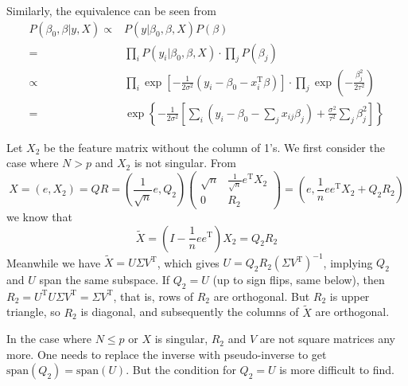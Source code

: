 \begin{sol}
Similarly, the equivalence can be seen from
\begin{align*}
P(\beta_0,\beta\vert y,X) \propto & P(y\vert\beta_0,\beta,X)P(\beta)\\
=& \prod_i P(y_i\vert\beta_0,\beta,X)\cdot\prod_j P(\beta_j)\\
\propto& \prod_i \exp\left[-\frac{1}{2\sigma^2}\left(y_i-\beta_0-x_i^\mathrm{T}\beta\right)\right] \cdot \prod_j \exp\left(-\frac{\beta_j^2}{2\tau^2}\right)\\
=& \exp\left\{-\frac{1}{2\sigma^2}\left[\sum_i \left(y_i-\beta_0-\sum_jx_{ij}\beta_j\right)+\frac{\sigma^2}{\tau^2}\sum_j \beta_j^2\right]\right\}
\end{align*}
\end{sol}

\begin{sol}
Let $X_2$ be the feature matrix without the column of 1's. We first consider the case where $N>p$ and $X_2$ is not singular. 
From
\[
X=(e,X_2)=QR=\left(\frac{1}{\sqrt{n}}e,Q_2\right)
\begin{pmatrix}
\sqrt{n} & \frac{1}{\sqrt{n}}e^\mathrm{T}X_2 \\
0 & R_2
\end{pmatrix}
=\left(e,\frac{1}{n}ee^\mathrm{T}X_2+Q_2R_2\right)
\]
we know that 
\[
\tilde{X}=\left(I-\frac{1}{n}ee^\mathrm{T}\right)X_2=Q_2R_2
\]
Meanwhile we have $\tilde{X}=U\Sigma V^\mathrm{T}$, which gives $U=Q_2R_2(\Sigma V^\mathrm{T})^{-1}$, implying $Q_2$ and $U$ span the same subspace. If $Q_2=U$ (up to sign flips, same below), then $R_2=U^\mathrm{T}U\Sigma V^\mathrm{T}=\Sigma V^\mathrm{T}$, that is, rows of $R_2$ are orthogonal. But $R_2$ is upper triangle, so $R_2$ is diagonal, and subsequently the columns of $\tilde{X}$ are orthogonal.

In the case where $N\le p$ or $X$ is singular, $R_2$ and $V$ are not square matrices any more. One needs to replace the inverse with pseudo-inverse to get $\mathrm{span}(Q_2)=\mathrm{span}(U)$. But the condition for $Q_2=U$ is more difficult to find.
\end{sol}

